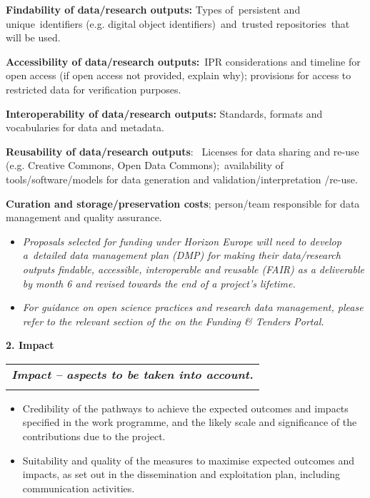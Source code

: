 \textbf{Findability of data/research outputs:} Types of~persistent and
unique~identifiers (e.g. digital object identifiers)~and~trusted
repositories~that will be used.

\textbf{Accessibility of data/research outputs:}~IPR considerations and
timeline for open access (if open access not provided, explain why);
provisions for access to restricted data for verification purposes.

\textbf{Interoperability of data/research outputs:} Standards, formats
and vocabularies for data and metadata.

\textbf{Reusability of data/research outputs}:~ Licenses for data
sharing and re-use (e.g. Creative Commons, Open Data
Commons);~availability of tools/software/models for data generation and
validation/interpretation /re-use.

\textbf{Curation and storage/preservation costs}; person/team
responsible for data management and quality assurance.

\begin{itemize}
\item
  \emph{Proposals selected for funding under Horizon Europe will need to
  develop a~detailed data management plan (DMP) for making their
  data/research outputs findable, accessible, interoperable and reusable
  (FAIR) as a deliverable by month 6 and revised towards the end of a
  project's lifetime. }
\item
  \emph{For guidance on open science practices and research data
  management, please refer to the relevant section of the on the Funding
  \& Tenders Portal.}
\end{itemize}

\textbf{2. Impact}

\begin{longtable}[]{@{}l@{}}
\toprule
\endhead
\textbf{\emph{Impact }\emph{--}\emph{ aspects to be taken into
account.}} \\
 \\
\bottomrule
\end{longtable}

\begin{itemize}
\item
  Credibility of the pathways to achieve the expected outcomes and
  impacts specified in the work programme, and the likely scale and
  significance of the contributions due to the project.
\item
  Suitability and quality of the measures to maximise expected outcomes
  and impacts, as set out in the dissemination and exploitation plan,
  including communication activities.
\end{itemize}

